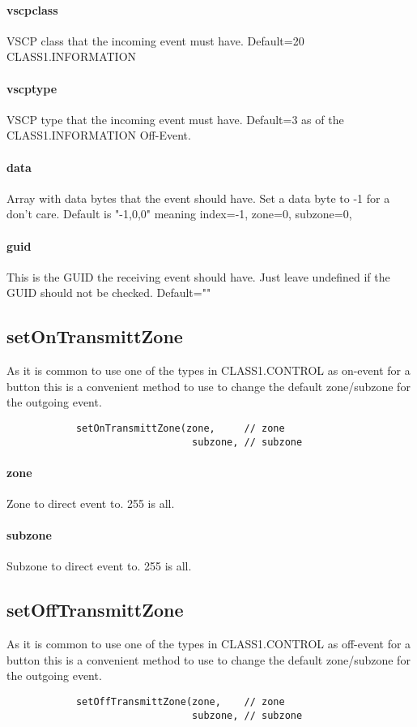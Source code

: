\documentclass{article}
\begin{document}
        \paragraph*{vscpclass}
        VSCP class that the incoming event must have. Default=20 CLASS1.INFORMATION
        \paragraph*{vscptype}
        VSCP type that the incoming event must have. Default=3 as of the 
        CLASS1.INFORMATION Off-Event.
        \paragraph*{data}
        Array with data bytes that the event should have. Set a data byte to -1
        for a don't care. Default
        is "-1,0,0" meaning index=-1, zone=0, subzone=0,
        \paragraph*{guid}
        This is the GUID the receiving event should have. Just leave undefined
        if the GUID should not be checked. Default=""
        
        
        \subsection*{setOnTransmittZone}
        As it is common to use one of the types in CLASS1.CONTROL as on-event
        for a button this is a convenient method to use to change the default
        zone/subzone for the outgoing event.
        \begin{verbatim}
            setOnTransmittZone(zone,     // zone
                                subzone, // subzone
        \end{verbatim}
        \paragraph*{zone}
        Zone to direct event to. 255 is all.
        \paragraph*{subzone}
        Subzone to direct event to. 255 is all.
        
        \subsection*{setOffTransmittZone}
        As it is common to use one of the types in CLASS1.CONTROL as off-event
        for a button this is a convenient method to use to change the default
        zone/subzone for the outgoing event.
        \begin{verbatim}
            setOffTransmittZone(zone,    // zone
                                subzone, // subzone
        \end{verbatim}
\end{document}
